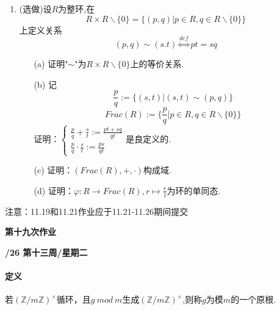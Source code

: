 \documentclass[a4paper,12pt]{article}
\begin{document}
\begin{enumerate}
    \item {\color{red} (选做)}设$R$为整环,在
    $$R\times R\backslash\{0\}=\{(p,q)|p\in R,q\in R\backslash\{0\}\}$$
    上定义关系
    $$(p,q)\sim(s.t)\overset{def}{\Leftrightarrow}pt=sq$$
    \begin{enumerate}
        \item[(a)] 证明"$\sim$"为$R\times R\backslash\{0\}$上的等价关系.
        \item[(b)] 记$$\frac{p}{q}:=\{(s,t)|(s,t)\sim(p,q)\}$$
        $$Frac(R):=\{\frac{p}{q}|p\in R,q\in R\backslash\{0\}\}$$
        证明：$\begin{cases}\frac{p}{q}+\frac{s}{t}:=\frac{pt+sq}{qt}\\\frac{p}{q}\cdot\frac{s}{t}:=\frac{ps}{qt}\end{cases}$是良定义的.
        \item[(c)] 证明：$(Frac(R),+,\cdot)$构成域.
        \item[(d)] 证明：$\varphi:R\to Frac(R),r\mapsto \frac r1$为环的单同态.
    \end{enumerate}
\end{enumerate}

{\color{red} 注意：11.19和11.21作业应于11.21-11.26期间提交} 

\newpage
\head

\begin{center} %
	{\Large \bf 第十九次作业} %
	\vspace{2mm}
	
	{\bf{}/26 \quad  第十三周/星期二} %
\end{center} 

\paragraph{定义}若$(\mathbb{Z}/m\mathbb{Z})^\times$循环，且$g\ mod\ m$生成$(\mathbb{Z}/m\mathbb{Z})^\times$,则称$g$为模$m$的一个原根.
\end{document}
